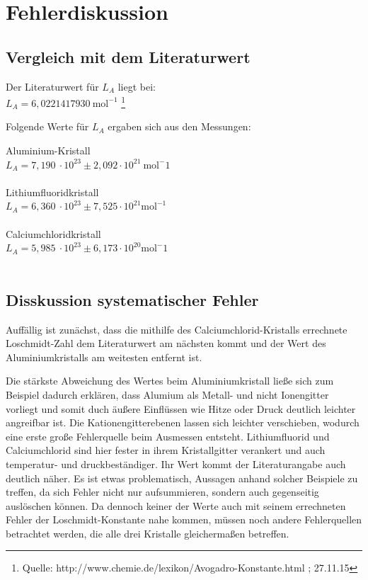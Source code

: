 \documentclass[12pt,a4paper,titlepage,headinclude,bibtotoc]{scrartcl}
\begin{document}
\section{Fehlerdiskussion}
\subsection{Vergleich mit dem Literaturwert}

Der Literaturwert für $L_A$ liegt bei:\\


$  L_A = 6,0221417930 \ \mathrm{mol^{-1}} $ \footnote{Quelle: http://www.chemie.de/lexikon/Avogadro-Konstante.html ; 27.11.15}

\vspace{3mm}
Folgende Werte für $L_A$ ergaben sich aus den Messungen:\\
\vspace{2.5mm}

 Aluminium-Kristall\\
 \quad $ L_A= 7,190 \ \cdot 10^{23}  \pm 2,092\cdot10^{21} \ \mathrm{mol^-1} $\\
   \\
 Lithiumfluoridkristall\\
\quad $ L_A = 6,360 \ \cdot 10^{23} \pm 7,525 \cdot 10^{21} \mathrm{mol^{-1}} $\\
 \\
 Calciumchloridkristall\\
 \quad $L_A = 5,985 \ \cdot 10^{23} \pm 6,173 \cdot 10^{20} \mathrm{mol^-1}$\\
 \\

\subsection{Disskussion systematischer Fehler}

Auffällig ist zunächst, dass die mithilfe des Calciumchlorid-Kristalls errechnete Loschmidt-Zahl dem Literaturwert am nächsten kommt und der Wert des Aluminiumkristalls am weitesten entfernt ist.


Die stärkste Abweichung des Wertes beim Aluminiumkristall ließe sich zum Beispiel dadurch erklären, dass Alumium als Metall- und nicht Ionengitter vorliegt und somit duch äußere Einflüssen wie Hitze oder Druck deutlich leichter angreifbar ist. Die Kationengitterebenen lassen sich leichter verschieben, wodurch eine erste große Fehlerquelle beim Ausmessen entsteht. Lithiumfluorid und Calciumchlorid sind hier fester in ihrem Kristallgitter verankert und auch temperatur- und druckbeständiger. Ihr Wert kommt der Literaturangabe auch deutlich näher.
Es ist etwas problematisch, Aussagen anhand solcher Beispiele zu treffen, da sich Fehler nicht nur aufsummieren, sondern auch gegenseitig auslöschen können. Da dennoch keiner der Werte auch mit seinem errechneten Fehler der Loschmidt-Konstante nahe kommen, müssen noch andere Fehlerquellen betrachtet werden, die alle drei Kristalle gleichermaßen betreffen.
\end{document}
